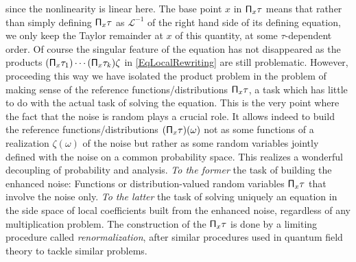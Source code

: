 \documentclass[10pt, reqno]{amsart}
\numberwithin{subsection}{section}
\numberwithin{subsubsection}{subsection}
\numberwithin{equation}{section} %
\theoremstyle{mystyle}
\theoremstyle{mystyle2}
\theoremstyle{mystyle3}
\newcommand{\mcL}{\mathcal{L}}
\begin{document}
since the nonlinearity is linear here. The base point $x$ in ${\sf \Pi}_x\tau$ means that rather than simply defining ${\sf \Pi}_x\tau$ as $\mcL^{-1}$ of the right hand side of its defining equation, we only keep the Taylor remainder at $x$ of this quantity, at some $\tau$-dependent order. Of course the singular feature of the equation has not disappeared as the products $({\sf \Pi}_x\tau_1)\cdots ({\sf \Pi}_x\tau_k)\zeta$ in \eqref{EqLocalRewriting} are still problematic. However, proceeding this way we have isolated the product problem in the problem of making sense of the reference functions/distributions ${\sf \Pi}_x\tau$, a task which has little to do with the actual task of solving the equation. This is the very point where the fact that the noise is random plays a crucial role. It allows indeed to build the reference functions/distributions $({\sf \Pi}_x\tau)(\omega)$ not as some functions of a realization $\zeta(\omega)$ of the noise but rather as  some random variables jointly defined with the noise on a common probability space. This realizes a wonderful decoupling of probability and analysis. {\it To the former} the task of building the enhanced noise: Functions or distribution-valued random variables ${\sf \Pi}_x\tau$ that involve the noise only. {\it To the latter} the task of solving uniquely an equation in  the side space  of local coefficients built from the enhanced noise, regardless of any multiplication problem. The construction of the ${\sf \Pi}_x\tau$ is done by a limiting procedure called \textit{renormalization}, after similar procedures used in quantum field theory to tackle similar problems.

\medskip
\end{document}
